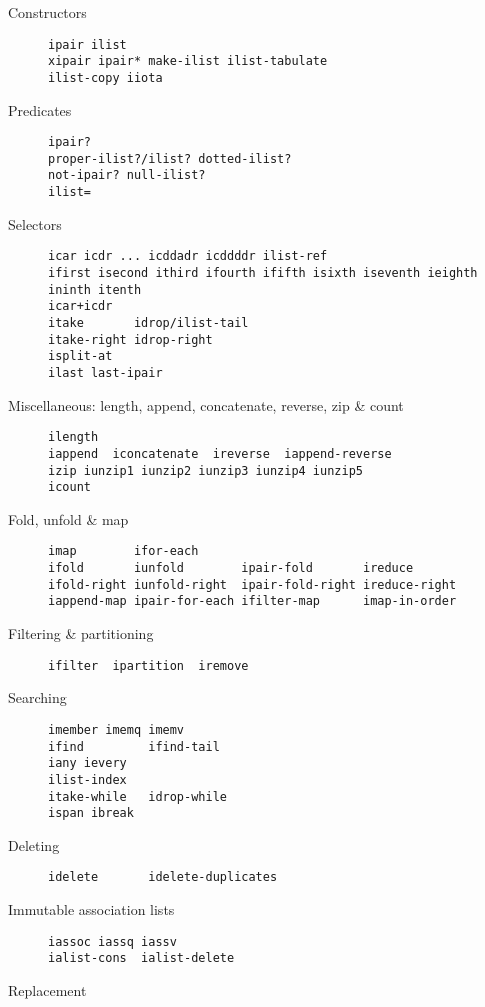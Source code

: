 \begin{description}
\item[ Constructors ]
\begin{verbatim}
ipair ilist
xipair ipair* make-ilist ilist-tabulate  
ilist-copy iiota
\end{verbatim}
\item[ Predicates ]
\begin{verbatim}
ipair?
proper-ilist?/ilist? dotted-ilist? 
not-ipair? null-ilist?
ilist=
\end{verbatim}
\item[ Selectors ]
\begin{verbatim}
icar icdr ... icddadr icddddr ilist-ref
ifirst isecond ithird ifourth ififth isixth iseventh ieighth ininth itenth
icar+icdr
itake       idrop/ilist-tail
itake-right idrop-right
isplit-at   
ilast last-ipair
\end{verbatim}
\item[ Miscellaneous: length, append, concatenate, reverse, zip \& count
]
\begin{verbatim}
ilength 
iappend  iconcatenate  ireverse  iappend-reverse
izip iunzip1 iunzip2 iunzip3 iunzip4 iunzip5
icount
\end{verbatim}
\item[ Fold, unfold \& map ]
\begin{verbatim}
imap        ifor-each
ifold       iunfold        ipair-fold       ireduce 
ifold-right iunfold-right  ipair-fold-right ireduce-right 
iappend-map ipair-for-each ifilter-map      imap-in-order
\end{verbatim}
\item[ Filtering \& partitioning ]
\begin{verbatim}
ifilter  ipartition  iremove
\end{verbatim}
\item[ Searching ]
\begin{verbatim}
imember imemq imemv
ifind         ifind-tail 
iany ievery
ilist-index
itake-while   idrop-while
ispan ibreak
\end{verbatim}
\item[ Deleting ]
\begin{verbatim}
idelete       idelete-duplicates 
\end{verbatim}
\item[ Immutable association lists ]
\begin{verbatim}
iassoc iassq iassv
ialist-cons  ialist-delete
\end{verbatim}
\item[ Replacement ]

\end{description}
